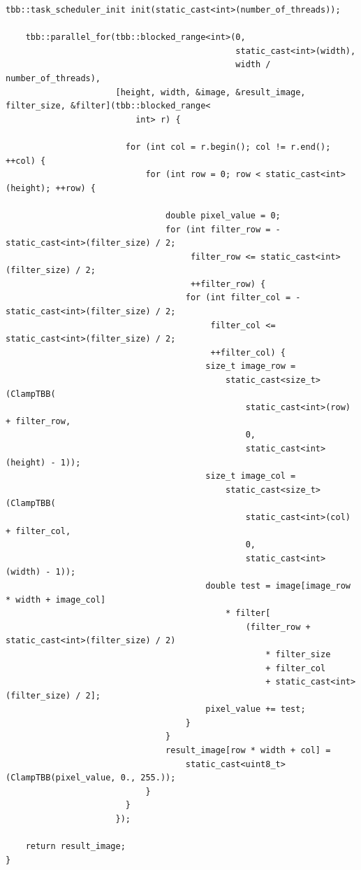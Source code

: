 \documentclass{report}
\begin{document}
\begin{lstlisting}[breaklines=true]
    tbb::task_scheduler_init init(static_cast<int>(number_of_threads));

    tbb::parallel_for(tbb::blocked_range<int>(0,
                                              static_cast<int>(width),
                                              width / number_of_threads),
                      [height, width, &image, &result_image, filter_size, &filter](tbb::blocked_range<
                          int> r) {

                        for (int col = r.begin(); col != r.end(); ++col) {
                            for (int row = 0; row < static_cast<int>(height); ++row) {

                                double pixel_value = 0;
                                for (int filter_row = -static_cast<int>(filter_size) / 2;
                                     filter_row <= static_cast<int>(filter_size) / 2;
                                     ++filter_row) {
                                    for (int filter_col = -static_cast<int>(filter_size) / 2;
                                         filter_col <= static_cast<int>(filter_size) / 2;
                                         ++filter_col) {
                                        size_t image_row =
                                            static_cast<size_t>(ClampTBB(
                                                static_cast<int>(row) + filter_row,
                                                0,
                                                static_cast<int>(height) - 1));
                                        size_t image_col =
                                            static_cast<size_t>(ClampTBB(
                                                static_cast<int>(col) + filter_col,
                                                0,
                                                static_cast<int>(width) - 1));
                                        double test = image[image_row * width + image_col]
                                            * filter[
                                                (filter_row + static_cast<int>(filter_size) / 2)
                                                    * filter_size
                                                    + filter_col
                                                    + static_cast<int>(filter_size) / 2];
                                        pixel_value += test;
                                    }
                                }
                                result_image[row * width + col] =
                                    static_cast<uint8_t>(ClampTBB(pixel_value, 0., 255.));
                            }
                        }
                      });

    return result_image;
}
\end{lstlisting}
\end{document}
